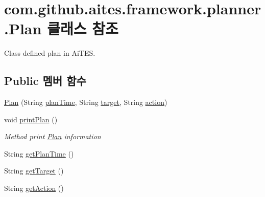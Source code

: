\hypertarget{classcom_1_1github_1_1aites_1_1framework_1_1planner_1_1_plan}{}\section{com.\+github.\+aites.\+framework.\+planner.\+Plan 클래스 참조}
\label{classcom_1_1github_1_1aites_1_1framework_1_1planner_1_1_plan}


Class defined plan in Ai\+T\+ES.  


\subsection*{Public 멤버 함수}
\begin{DoxyCompactItemize}
\item 
\mbox{\hyperlink{classcom_1_1github_1_1aites_1_1framework_1_1planner_1_1_plan_a2a4e43ba9fcdf4f632ad3c297e3cbbc1}{Plan}} (String \mbox{\hyperlink{classcom_1_1github_1_1aites_1_1framework_1_1planner_1_1_plan_a4729359a276d3dda6350a16233754f9e}{plan\+Time}}, String \mbox{\hyperlink{classcom_1_1github_1_1aites_1_1framework_1_1planner_1_1_plan_a3f45ee392c1af51834376a138bf8f325}{target}}, String \mbox{\hyperlink{classcom_1_1github_1_1aites_1_1framework_1_1planner_1_1_plan_a7b7babde3735425a6e14a679bff3150c}{action}})
\item 
void \mbox{\hyperlink{classcom_1_1github_1_1aites_1_1framework_1_1planner_1_1_plan_a56e481c028659c181b2b3123cc499dd7}{print\+Plan}} ()
\begin{DoxyCompactList}\small\item\em Method print \mbox{\hyperlink{classcom_1_1github_1_1aites_1_1framework_1_1planner_1_1_plan}{Plan}} information \end{DoxyCompactList}\item 
String \mbox{\hyperlink{classcom_1_1github_1_1aites_1_1framework_1_1planner_1_1_plan_a661fbbeebc5bf62dafc4e5c3e19bce00}{get\+Plan\+Time}} ()
\item 
String \mbox{\hyperlink{classcom_1_1github_1_1aites_1_1framework_1_1planner_1_1_plan_a584286fbc03c26c0b493c8961da1598e}{get\+Target}} ()
\item 
String \mbox{\hyperlink{classcom_1_1github_1_1aites_1_1framework_1_1planner_1_1_plan_af73a6ef1c0276f733948ea7fdb70aca7}{get\+Action}} ()
\end{DoxyCompactItemize}
